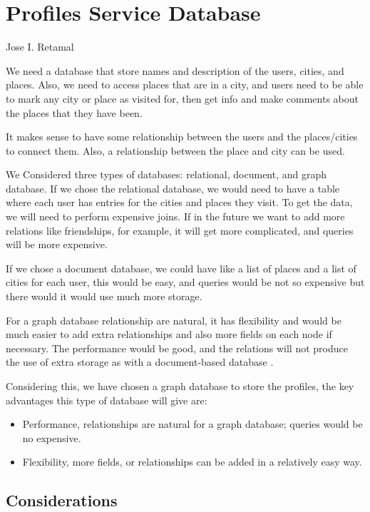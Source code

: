 \section{Profiles Service Database}{Jose I. Retamal }

\indent
\indent
We need a database that store names and description of the users, cities, and places. Also, we need to access places that are in a city, and users need to be able to mark any city or place as visited for, then get info and make comments about the places that they have been. 

It makes sense to have some relationship between the users and the places/cities to connect them. Also, a relationship between the place and city can be used. 

We Considered three types of databases: relational, document, and graph database. 
If we chose the relational database, we would need to have a table where each user has entries for the cities and places they visit. To get the data, we will need to perform expensive joins. If in the future we want to add more relations like friendships, for example, it will get more complicated, and queries will be more expensive. 

If we chose a document database, we could have like a list of places and a list of cities for each user, this would be easy, and queries would be not so expensive but there would it would use much more storage. 

For a graph database relationship are natural, it has flexibility and would be much easier to add extra relationships and also more fields on each node if necessary. The performance would be good, and the relations will not produce the use of extra storage as with a document-based database \cite{gdbad}.

Considering this, we have chosen a graph database to store the profiles, the key advantages this type of database will give are:

\begin{itemize}
	\item Performance, relationships are natural for a graph database; queries would be no expensive.
	\item Flexibility, more fields, or relationships can be added in a relatively easy way.
\end{itemize}

\subsection{Considerations}

